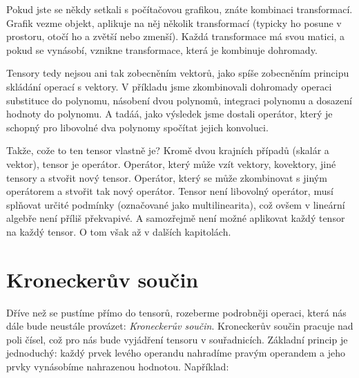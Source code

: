 \documentclass[a5paper,12pt]{amsbook}
\theoremstyle{definition}
\begin{document}
Pokud jste se někdy setkali s počítačovou grafikou, znáte kombinaci transformací. Grafik vezme objekt,
aplikuje na něj několik transformací (typicky ho posune v prostoru, otočí ho a zvětší nebo zmenší).
Každá transformace má svou matici, a pokud se vynásobí, vznikne transformace, která je kombinuje
dohromady.

Tensory tedy nejsou ani tak zobecněním vektorů, jako spíše zobecněním principu skládání operací s vektory.
V příkladu jsme zkombinovali dohromady operaci substituce do polynomu, násobení dvou polynomů, integraci
polynomu a dosazení hodnoty do polynomu. A tadáá, jako výsledek jsme dostali operátor, který je schopný
pro libovolné dva polynomy spočítat jejich konvoluci.

Takže, cože to ten tensor vlastně je? Kromě dvou krajních případů (skalár a vektor), tensor je operátor.
Operátor, který může vzít vektory, kovektory, jiné tensory a stvořit nový tensor. Operátor, který se může
zkombinovat s jiným operátorem a stvořit tak nový operátor. Tensor není libovolný operátor, musí splňovat
určité podmínky (označované jako multilinearita), což ovšem v lineární algebře není příliš překvapivé.
A samozřejmě není možné aplikovat každý tensor na každý tensor. O tom však až v dalších kapitolách.

\section{Kroneckerův součin}

\noindent
Dříve než se pustíme přímo do tensorů, rozeberme podrobněji operaci, která nás dále bude neustále provázet:
\textit{Kroneckerův součin}. Kroneckerův součin pracuje nad poli čísel, což pro nás bude vyjádření tensoru
v souřadnicích. Základní princip je jednoduchý: každý prvek levého operandu nahradíme pravým operandem a jeho
prvky vynásobíme nahrazenou hodnotou. Například:
\end{document}
